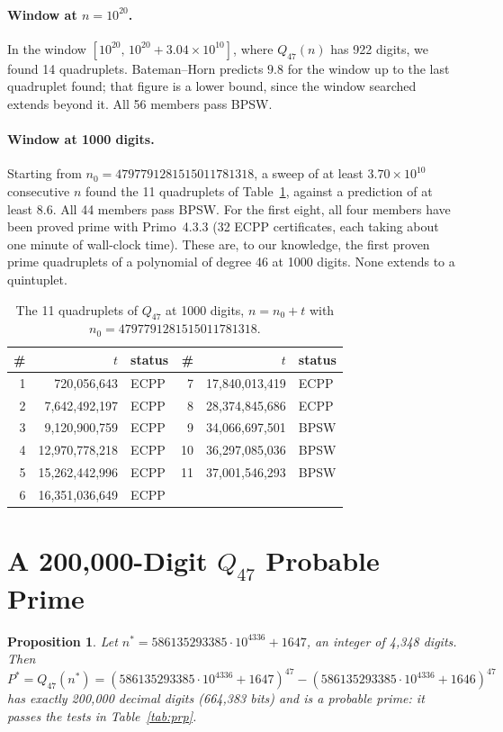 \documentclass[11pt,a4paper]{article}
\newtheorem{proposition}{Proposition}
\theoremstyle{remark}
\begin{document}
\paragraph{Window at $n=10^{20}$.} In the window $[10^{20},\,10^{20}+3.04\times10^{10}]$, where $Q_{47}(n)$ has 922 digits, we found 14 quadruplets. Bateman--Horn predicts $9.8$ for the window up to the last quadruplet found; that figure is a lower bound, since the window searched extends beyond it. All 56 members pass BPSW.

\paragraph{Window at 1000 digits.} Starting from $n_0=4797791281515011781318$, a sweep of at least $3.70\times10^{10}$ consecutive $n$ found the 11 quadruplets of Table~\ref{tab:1000}, against a prediction of at least $8.6$. All 44 members pass BPSW. For the first eight, all four members have been proved prime with Primo~4.3.3 (32 ECPP certificates, each taking about one minute of wall-clock time). These are, to our knowledge, the first proven prime quadruplets of a polynomial of degree 46 at 1000 digits. None extends to a quintuplet.

\begin{table}[h]
\centering
\caption{The 11 quadruplets of $Q_{47}$ at 1000 digits, $n=n_0+t$ with $n_0=4797791281515011781318$.}\label{tab:1000}
\small
\begin{tabular}{rrl@{\hspace{2em}}rrl}
\toprule
\# & $t$ & status & \# & $t$ & status\\
\midrule
1 & 720,056,643 & ECPP & 7 & 17,840,013,419 & ECPP\\
2 & 7,642,492,197 & ECPP & 8 & 28,374,845,686 & ECPP\\
3 & 9,120,900,759 & ECPP & 9 & 34,066,697,501 & BPSW\\
4 & 12,970,778,218 & ECPP & 10 & 36,297,085,036 & BPSW\\
5 & 15,262,442,996 & ECPP & 11 & 37,001,546,293 & BPSW\\
6 & 16,351,036,649 & ECPP & & & \\
\bottomrule
\end{tabular}
\end{table}

\section{A 200,000-Digit $Q_{47}$ Probable Prime}\label{sec:prp}
\begin{proposition}\label{prop:prp}
Let $n^\ast = 586135293385\cdot10^{4336} + 1647$, an integer of 4,348 digits. Then
\[
P^\ast = Q_{47}(n^\ast) = (586135293385\cdot 10^{4336}+1647)^{47} - (586135293385\cdot 10^{4336}+1646)^{47}
\]
has exactly 200,000 decimal digits (664,383 bits) and is a probable prime: it passes the tests in Table~\ref{tab:prp}.
\end{proposition}
\end{document}
